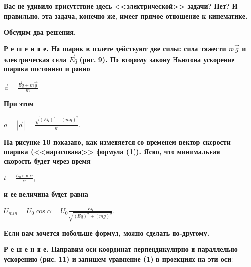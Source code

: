 \begin{multicols}{2}
    \textbf{Вас не удивило присутствие здесь <<электрической>> задачи? Нет? И правильно, эта задача, конечно же, имеет прямое отношение к кинематике.}
    
    \textbf{Обсудим два решения.}
    
    \textbf{Р е ш е н и е. На шарик в полете действуют две силы: сила тяжести $m\vec{g}$ и электрическая сила $\vec{E}q$ (рис. 9). По второму закону Ньютона ускорение шарика постоянно и равно}
    
    \begin{center}
        $\vec{a} = \frac{\vec{E}q + m\vec{g}}{m}$. 
    \end{center}
    
    \noindent\textbf{При этом}
    
    \begin{center}
        $a = |\vec{a}| = \frac{\sqrt{(Eq)^2 + (mg)^2}}{m}$. 
    \end{center}
    
    \noindent\textbf{На рисунке 10 показано, как изменяется со временем вектор скорости шарика (<<нарисована>> формула (1)). Ясно, что минимальная скорость будет через время}
    
    \begin{center}
        $t = \frac{U_0\sin{\alpha}}{\alpha}$,
    \end{center}
    
    \noindent\textbf{и ее величина будет равна}
    
    \begin{center}
        $U_{min} = U_0 \cos{\alpha} = U_0 \frac{Eq}{\sqrt{(Eq)^2 + (mg)^2}}$.
    \end{center}
    
    \textbf{Если вам хочется побольше формул, можно сделать по-другому.}
    
    \textbf{Р е ш е н и е. Направим оси координат перпендикулярно и параллельно ускорению (рис. 11) и запишем уравнение (1) в проекциях на эти оси:}
    
\end{multicols}
    
% 